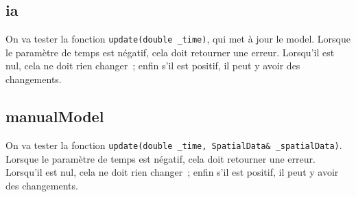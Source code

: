 

\subsection{ia}

On va tester la fonction \texttt{update(double \_time)}, qui met à jour le model. Lorsque le paramètre de temps est négatif, cela doit retourner une erreur. Lorsqu'il est nul, cela ne doit rien changer~; enfin s'il est positif, il peut y avoir des changements.



\subsection{manualModel}

On va tester la fonction \texttt{update(double \_time, SpatialData\& \_spatialData)}. Lorsque le paramètre de temps est négatif, cela doit retourner une erreur. Lorsqu'il est nul, cela ne doit rien changer~; enfin s'il est positif, il peut y avoir des changements.






